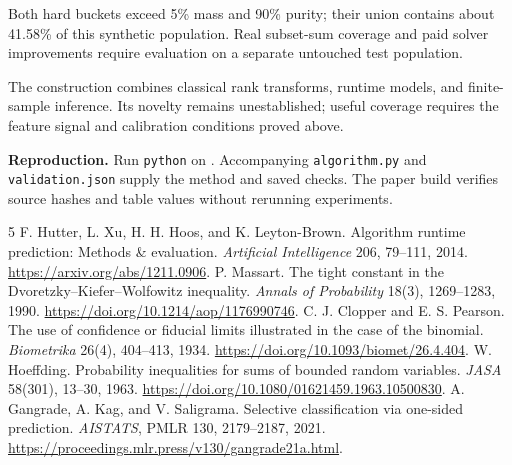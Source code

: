 \documentclass[10pt,letterpaper]{article}
\begin{document}
Both hard buckets exceed 5\% mass and 90\% purity; their union contains about 41.58\% of this synthetic population. Real subset-sum coverage and paid solver improvements require evaluation on a separate untouched test population.

The construction combines classical rank transforms, runtime models, and finite-sample inference. Its novelty remains unestablished; useful coverage requires the feature signal and calibration conditions proved above.

\vspace{2pt}
{\small\textbf{Reproduction.} Run \texttt{python} on . Accompanying \texttt{algorithm.py} and \texttt{validation.json} supply the method and saved checks. The paper build verifies source hashes and table values without rerunning experiments.}

\begingroup\small
\begin{thebibliography}{5}
\setlength{\itemsep}{1pt}\setlength{\parskip}{0pt}
 F. Hutter, L. Xu, H. H. Hoos, and K. Leyton-Brown.
Algorithm runtime prediction: Methods \& evaluation. \emph{Artificial Intelligence} 206, 79--111, 2014. \url{https://arxiv.org/abs/1211.0906}.
 P. Massart. The tight constant in the Dvoretzky--Kiefer--Wolfowitz inequality. \emph{Annals of Probability} 18(3), 1269--1283, 1990. \url{https://doi.org/10.1214/aop/1176990746}.
 C. J. Clopper and E. S. Pearson. The use of confidence or fiducial limits illustrated in the case of the binomial. \emph{Biometrika} 26(4), 404--413, 1934. \url{https://doi.org/10.1093/biomet/26.4.404}.
 W. Hoeffding. Probability inequalities for sums of bounded random variables. \emph{JASA} 58(301), 13--30, 1963. \url{https://doi.org/10.1080/01621459.1963.10500830}.
 A. Gangrade, A. Kag, and V. Saligrama. Selective classification via one-sided prediction. \emph{AISTATS}, PMLR 130, 2179--2187, 2021. \url{https://proceedings.mlr.press/v130/gangrade21a.html}.
\end{thebibliography}
\endgroup
\end{document}
